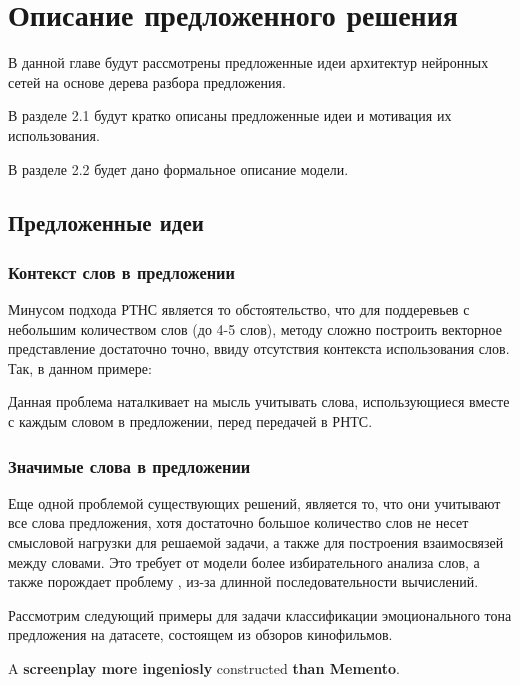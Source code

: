 
\chapter{Описание предложенного решения}

В данной главе будут рассмотрены предложенные идеи архитектур нейронных сетей на основе дерева разбора предложения.

В разделе 2.1 будут кратко описаны предложенные идеи и мотивация их использования.

В разделе 2.2 будет дано формальное описание модели.

\section{Предложенные идеи}

\subsection{Контекст слов в предложении}

Минусом подхода РТНС является то обстоятельство, что для поддеревьев с небольшим количеством слов (до 4-5 слов), методу сложно построить векторное представление достаточно точно, ввиду отсутствия контекста использования слов. 
Так, в данном примере:


Данная проблема наталкивает на мысль учитывать слова, 
использующиеся вместе с каждым словом в предложении, перед передачей в РНТС.

\subsection{Значимые слова в предложении}
Еще одной проблемой существующих решений, является то,  что они учитывают все слова предложения, 
хотя достаточно большое количество слов не несет смысловой нагрузки для решаемой задачи, а также для построения взаимосвязей
между словами.
Это требует от модели более избирательного анализа слов, а также порождает проблему , из-за 
длинной последовательности вычислений.

Рассмотрим следующий примеры для задачи классификации эмоционального тона предложения на датасете, состоящем из
обзоров кинофильмов.

{\selectfont A \textbf{screenplay more ingeniosly} constructed \textbf{than Memento}.}

